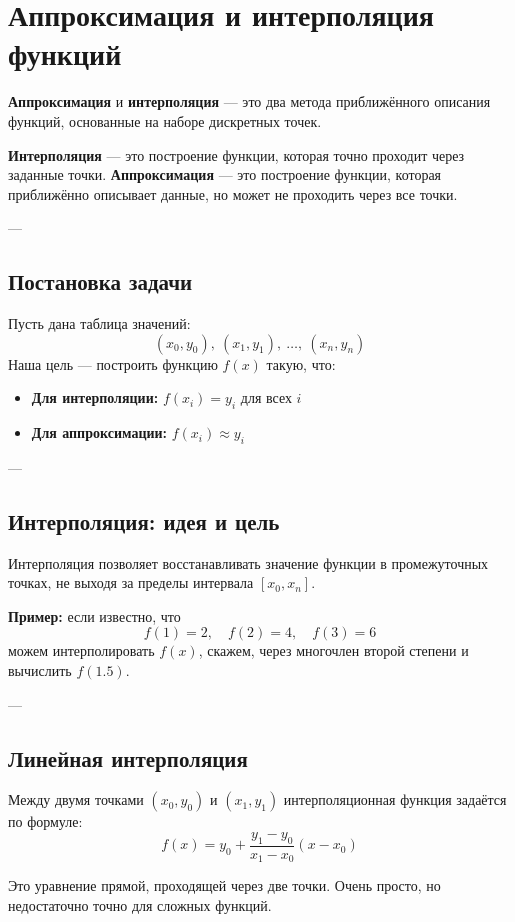 \section{Аппроксимация и интерполяция функций}

\textbf{Аппроксимация} и \textbf{интерполяция} — это два метода приближённого описания функций, основанные на наборе дискретных точек.

\textbf{Интерполяция} — это построение функции, которая точно проходит через заданные точки.  
\textbf{Аппроксимация} — это построение функции, которая приближённо описывает данные, но может не проходить через все точки.

---

\subsection*{Постановка задачи}

Пусть дана таблица значений:
\[
(x_0, y_0), \ (x_1, y_1), \ \dots, \ (x_n, y_n)
\]
Наша цель — построить функцию $f(x)$ такую, что:
\begin{itemize}
  \item \textbf{Для интерполяции:} $f(x_i) = y_i$ для всех $i$
  \item \textbf{Для аппроксимации:} $f(x_i) \approx y_i$
\end{itemize}

---

\subsection*{Интерполяция: идея и цель}

Интерполяция позволяет восстанавливать значение функции в промежуточных точках, не выходя за пределы интервала $[x_0, x_n]$.

\textbf{Пример:} если известно, что
\[
f(1) = 2, \quad f(2) = 4, \quad f(3) = 6
\]
можем интерполировать $f(x)$, скажем, через многочлен второй степени и вычислить $f(1.5)$.

---

\subsection*{Линейная интерполяция}

Между двумя точками $(x_0, y_0)$ и $(x_1, y_1)$ интерполяционная функция задаётся по формуле:
\[
f(x) = y_0 + \frac{y_1 - y_0}{x_1 - x_0}(x - x_0)
\]

Это уравнение прямой, проходящей через две точки. Очень просто, но недостаточно точно для сложных функций.

